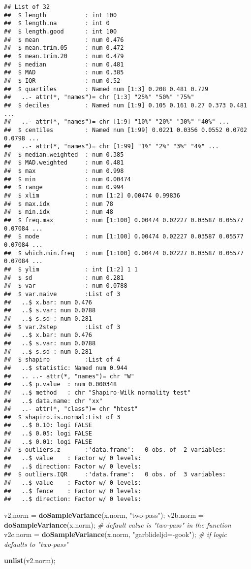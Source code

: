 \documentclass[
]{article}
\newenvironment{Shaded}{\begin{snugshade}}{\end{snugshade}}
\newcommand{\CommentTok}[1]{\textcolor[rgb]{0.56,0.35,0.01}{\textit{#1}}}
\newcommand{\KeywordTok}[1]{\textcolor[rgb]{0.13,0.29,0.53}{\textbf{#1}}}
\newcommand{\NormalTok}[1]{#1}
\newcommand{\StringTok}[1]{\textcolor[rgb]{0.31,0.60,0.02}{#1}}
\begin{document}
\begin{verbatim}
## List of 32
##  $ length           : int 100
##  $ length.na        : int 0
##  $ length.good      : int 100
##  $ mean             : num 0.476
##  $ mean.trim.05     : num 0.472
##  $ mean.trim.20     : num 0.479
##  $ median           : num 0.481
##  $ MAD              : num 0.385
##  $ IQR              : num 0.52
##  $ quartiles        : Named num [1:3] 0.208 0.481 0.729
##   ..- attr(*, "names")= chr [1:3] "25%" "50%" "75%"
##  $ deciles          : Named num [1:9] 0.105 0.161 0.27 0.373 0.481 ...
##   ..- attr(*, "names")= chr [1:9] "10%" "20%" "30%" "40%" ...
##  $ centiles         : Named num [1:99] 0.0221 0.0356 0.0552 0.0702 0.0798 ...
##   ..- attr(*, "names")= chr [1:99] "1%" "2%" "3%" "4%" ...
##  $ median.weighted  : num 0.385
##  $ MAD.weighted     : num 0.481
##  $ max              : num 0.998
##  $ min              : num 0.00474
##  $ range            : num 0.994
##  $ xlim             : num [1:2] 0.00474 0.99836
##  $ max.idx          : num 78
##  $ min.idx          : num 48
##  $ freq.max         : num [1:100] 0.00474 0.02227 0.03587 0.05577 0.07084 ...
##  $ mode             : num [1:100] 0.00474 0.02227 0.03587 0.05577 0.07084 ...
##  $ which.min.freq   : num [1:100] 0.00474 0.02227 0.03587 0.05577 0.07084 ...
##  $ ylim             : int [1:2] 1 1
##  $ sd               : num 0.281
##  $ var              : num 0.0788
##  $ var.naive        :List of 3
##   ..$ x.bar: num 0.476
##   ..$ s.var: num 0.0788
##   ..$ s.sd : num 0.281
##  $ var.2step        :List of 3
##   ..$ x.bar: num 0.476
##   ..$ s.var: num 0.0788
##   ..$ s.sd : num 0.281
##  $ shapiro          :List of 4
##   ..$ statistic: Named num 0.944
##   .. ..- attr(*, "names")= chr "W"
##   ..$ p.value  : num 0.000348
##   ..$ method   : chr "Shapiro-Wilk normality test"
##   ..$ data.name: chr "xx"
##   ..- attr(*, "class")= chr "htest"
##  $ shapiro.is.normal:List of 3
##   ..$ 0.10: logi FALSE
##   ..$ 0.05: logi FALSE
##   ..$ 0.01: logi FALSE
##  $ outliers.z       :'data.frame':   0 obs. of  2 variables:
##   ..$ value    : Factor w/ 0 levels: 
##   ..$ direction: Factor w/ 0 levels: 
##  $ outliers.IQR     :'data.frame':   0 obs. of  3 variables:
##   ..$ value    : Factor w/ 0 levels: 
##   ..$ fence    : Factor w/ 0 levels: 
##   ..$ direction: Factor w/ 0 levels:
\end{verbatim}

\begin{Shaded}
\begin{Highlighting}[]
\NormalTok{v2.norm =}\StringTok{ }\KeywordTok{doSampleVariance}\NormalTok{(x.norm, }\StringTok{"two-pass"}\NormalTok{);}
\NormalTok{v2b.norm =}\StringTok{ }\KeywordTok{doSampleVariance}\NormalTok{(x.norm);  }\CommentTok{# default value is "two-pass" in the function}
\NormalTok{v2c.norm =}\StringTok{ }\KeywordTok{doSampleVariance}\NormalTok{(x.norm, }\StringTok{"garblideljd=-gook"}\NormalTok{); }\CommentTok{# if logic defaults to "two-pass"}

\KeywordTok{unlist}\NormalTok{(v2.norm);}
\end{Highlighting}
\end{Shaded}
\end{document}
